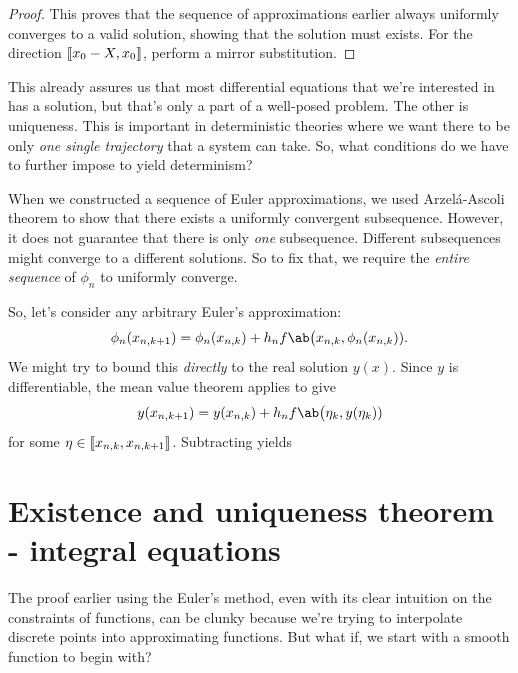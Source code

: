 \begin{proof}
  This proves that the sequence of approximations earlier always uniformly converges
  to a valid solution, showing that the solution must exists. For the direction
  \(\cintv{x_0 - X, x_0}\), perform a mirror substitution.
\end{proof}

This already assures us that most differential equations that we're interested in has
a solution, but that's only a part of a well-posed problem. The other is uniqueness. This
is important in deterministic theories where we want there to be only \emph{one single trajectory}
that a system can take. So, what conditions do we have to further impose to yield determinism?

When we constructed a sequence of Euler approximations, we used Arzel\'a-Ascoli theorem to
show that there exists a uniformly convergent subsequence. However, it does not guarantee that there
is only \emph{one} subsequence. Different subsequences might converge to a different solutions.
So to fix that, we require the \emph{entire sequence} of \(\phi_n\) to uniformly converge.

So, let's consider any arbitrary Euler's approximation:
\begin{equation}
  \phi_n(x_{n, k+1}) = \phi_n(x_{n, k}) + h_n f\ab\big(x_{n, k}, \phi_n(x_{n, k})).
\end{equation}
We might try to bound this \emph{directly} to the real solution \(y(x)\). Since \(y\)
is differentiable, the mean value theorem applies to give
\begin{equation}
  y(x_{n, k+1}) = y(x_{n, k}) + h_n f\ab\big(\eta_k, y(\eta_k))
\end{equation}
for some \(\eta \in \cintv{x_{n, k}, x_{n, k + 1}}\). Subtracting yields

\section{Existence and uniqueness theorem - integral equations}

The proof earlier using the Euler's method, even with its clear intuition on the
constraints of functions, can be clunky because we're trying to interpolate discrete
points into approximating functions. But what if, we start with a smooth function to begin with?

